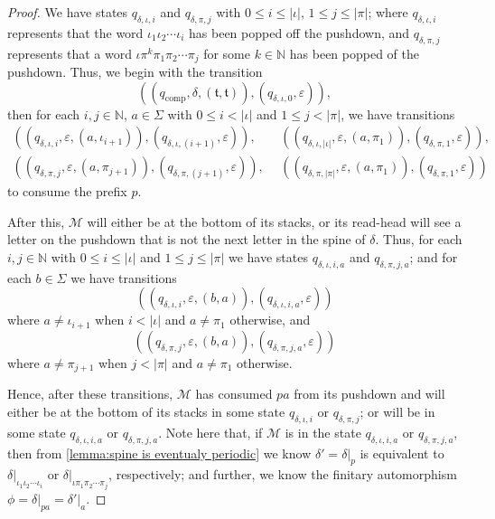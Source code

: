 \begin{proof}
	We have states $q_{\delta,\iota,i}$ and $q_{\delta,\pi,j}$ with $0 \leq i \leq \vert \iota \vert$, $1 \leq j \leq \vert \pi \vert$; where $q_{\delta,\iota,i}$ represents that the word $\iota_1 \iota_2 \cdots \iota_i$ has been popped off the pushdown, and $q_{\delta,\pi,j}$ represents that a word $\iota\pi^k\pi_1\pi_2\cdots \pi_j$ for some $k \in \mathbb{N}$ has been popped of the pushdown.
	Thus, we begin with the transition
	\[
	(
	(q_\mathrm{comp}, \delta, (\mathfrak{t},\mathfrak{t})),
	(q_{\delta,\iota,0},\varepsilon)
	),
	\]
	then for each $i,j\in \mathbb{N}$, $a \in \Sigma$ with $0 \leq i < \vert \iota \vert$ and $1 \leq j < \vert \pi \vert$, we have transitions
	\begin{align*}
		(
		(q_{\delta,\iota,i}, \varepsilon, (a,\iota_{i+1})),
		(q_{\delta,\iota,(i+1)},\varepsilon)
		),&\ \ 
		(
		(q_{\delta,\iota,|\iota|}, \varepsilon, (a,\pi_1)),
		(q_{\delta,\pi,1},\varepsilon)
		),
		\\
		(
		(q_{\delta,\pi,j}, \varepsilon, (a,\pi_{j+1})),
		(q_{\delta,\pi,(j+1)},\varepsilon)
		),&\ \ 
		(
		(q_{\delta,\pi,|\pi|}, \varepsilon, (a,\pi_1)),
		(q_{\delta,\pi,1},\varepsilon)
		)
	\end{align*}
	to consume the prefix $p$.
	
	After this,  $\mathcal{M}$ will either be at the bottom of its stacks, or its read-head will see a letter on the pushdown that is not the next letter in the spine of $\delta$.
	Thus, for each $i,j \in \mathbb{N}$ with $0 \leq i \leq \vert \iota \vert$ and $1 \leq j \leq |\pi|$ we have states $q_{\delta,\iota,i,a}$ and $q_{\delta,\pi,j,a}$;
	and for each $b \in \Sigma$ we have transitions
	\[
	(
	(q_{\delta,\iota,i}, \varepsilon, (b,a)),
	(q_{\delta,\iota,i,a},\varepsilon)
	)
	\]
	where $a \neq \iota_{i+1}$ when $i < |\iota|$ and $a \neq \pi_1$ otherwise, and
	\[
	(
	(q_{\delta,\pi,j}, \varepsilon, (b,a)),
	(q_{\delta,\pi,j,a},\varepsilon)
	)
	\]
	where $a \neq \pi_{j+1}$ when $j < |\pi|$ and $a \neq \pi_1$ otherwise.
	
	Hence, after these transitions, $\mathcal{M}$ has consumed $pa$ from its pushdown and will either be at the bottom of its stacks in some state $q_{\delta,\iota,i}$ or $q_{\delta,\pi,j}$; or will be in some state $q_{\delta,\iota,i,a}$ or $q_{\delta,\pi,j,a}$.
	Note here that, if $\mathcal{M}$ is in the state $q_{\delta,\iota,i,a}$ or $q_{\delta,\pi,j,a}$, then from \cref{lemma:spine is eventualy periodic} we know $\delta' = \delta\vert_{p}$ is equivalent to $\delta\vert_{\iota_1 \iota_2\cdots \iota_i}$ or $\delta\vert_{\iota \pi_1 \pi_2 \cdots \pi_j}$, respectively; and further, we know the finitary automorphism $\phi = \delta\vert_{pa} = \delta'\vert_a$.
	

\end{proof}
